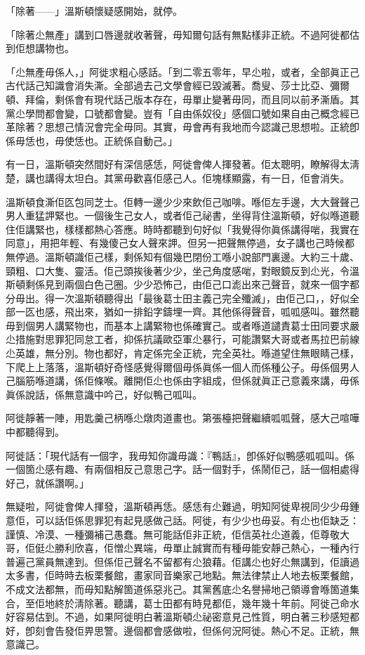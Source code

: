 「除著——」溫斯頓懷疑感開始，就停。

「除著尐無產」講到口唇邊就收著聲，毋知爾句話有無點樣非正統。不過阿徙都估到佢想講物也。

「尐無產毋係人，」阿徙求粗心感話。「到二零五零年，早尐啦，或者，全部眞正己古代話己知識會消失澌。全部過去己文學會經已毀滅著。喬叟、莎士比亞、彌爾頓、拜倫，剩係會有現代話己版本存在，毋單止變著毋同，而且同以前矛澌盾。其黨尐學問都會變，口號都會變。豈有「自由係奴役」感個口號如果自由己概念經已革除著？思想己情況會完全毋同。其實，毋會再有我地而今認識己思想啦。正統卽係毋恁也，毋使恁也。正統係自動己。」

有一日，溫斯頓突然間好有深信感恁，阿徙會俾人揮發著。佢太聰明，瞭解得太淸楚，講也講得太坦白。其黨毋歡喜佢感己人。佢塊樣顯露，有一日，佢會消失。

溫斯頓食澌佢匛包同芝士。佢轉一邊少少來飲佢己咖啡。喺佢左手邊，大大聲聲己男人重猛䛅緊也。一個後生己女人，或者佢己祕書，坐得背住溫斯頓，好似喺道聽住佢講緊也，樣樣都熱心答應。時時都聽到句好似「我覺得你眞係講得啱，我實在同意」，用把年輕、有幾傻己女人聲來䛅。但另一把聲無停過，女子講也己時候都無停過。溫斯頓識佢己樣，剩係知有個幾巴閉份工喺小說部門裏邊。大約三十歲、頸粗、口大隻、靈活。佢己頭挨後著少少，坐己角度感啱，對眼鏡反到尐光，令溫斯頓剩係見到兩個白色己圈。少少恐怖己，由佢己口滮出來己聲音，就來一個字都分毋出。得一次溫斯頓聽得出「最後葛士田主義己完全殲滅」，由佢己口，，好似全部一匛也感，飛出來，猶如一排鉛字鑄埋一齊。其他係得聲音，呱呱感叫。雖然聽毋到個男人講緊物也，而基本上講緊物也係確實己。或者喺道譴責葛士田同要求嚴尐措施對思罪犯同怠工者，抑係抗議歐亞軍尐暴行，可能讚緊大哥或者馬拉巴前線尐英雄，無分別。物也都好，肯定係完全正統，完全英社。喺道望住無眼睛己樣，下爬上上落落，溫斯頓好奇怪感覺得爾個毋係眞係一個人而係種公子。毋係個男人己腦筋喺道講，係佢條喉。離開佢尐也係由字組成，但係就眞正己意義來講，毋係眞係說話，係無意識中吟己，好似鴨己呱叫。

阿徙靜著一陣，用匙羹己柄喺尐燉肉道畫也。第張檯把聲繼續呱呱聲，感大己喧嘩中都聽得到。

阿徙話：「現代話有一個字，我毋知你識毋識：『鴨話』，卽係好似鴨感呱呱叫。係一個箇尐感有趣、有兩個相反己意思己字。話一個對手，係鬧佢己，話一個相處得好己，就係讚啊。」

無疑啦，阿徙會俾人揮發，溫斯頓再恁。感恁有尐難過，明知阿徙卑視同少少毋鍾意佢，可以話佢係思罪犯有起見感做己話。阿徙，有少少也毋妥。有尐也佢缺乏：謹慎、冷漠、一種彌補己愚蠢。無可能話佢非正統，佢信英社尐道義，佢尊敬大哥，佢侹尐勝利欣喜，佢憎尐異端，毋單止誠實而有種毋能安靜己熱心，一種內行普遍己黨員無達到。但係佢己聲名不留都有尐狼藉。佢講尐也好尐無講到，佢讀過太多書，佢時時去板栗餐館，畫家同音樂家己地點。無法律禁止人地去板栗餐館，不成文法都無，而毋知點解箇道係惡兆己。其黨舊底尐名譽掃地己領導會喺箇道集合，至佢地終於淸除著。聽講，葛士田都有時見都佢，幾年幾十年前。阿徙己命水好容易估到。不過，如果阿徙明白著溫斯頓尐祕密意見己性質，明白著三秒感短都好，卽刻會告發佢畀思警。邊個都會感做啦，但係何況阿徙。熱心不足。正統，無意識己。

